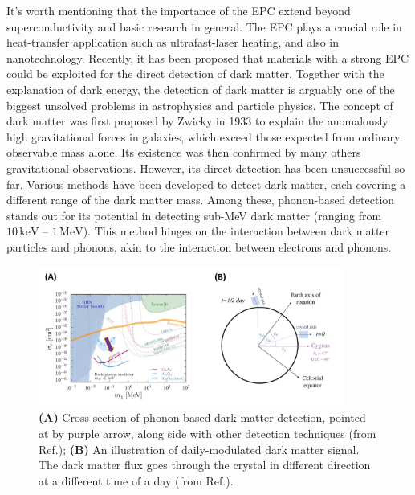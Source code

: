 \documentclass[11pt]{article}
\begin{document}
It's worth mentioning that the importance of the EPC extend beyond superconductivity and basic research in general.
The EPC plays a crucial role in heat-transfer application such as ultrafast-laser heating\cite{guo_heat_2012}, and also in nanotechnology\cite{zheng_dynamics_2018}.
Recently, it has been proposed that materials with a strong EPC could be exploited for the direct detection of dark matter.
Together with the explanation of dark energy, the detection of dark matter is arguably one of the biggest unsolved problems in astrophysics and particle physics.
The concept of dark matter was first proposed by Zwicky in 1933\cite{andernach_english_2017} to explain the anomalously high gravitational forces in galaxies, which exceed those expected from ordinary observable mass alone. Its existence was then confirmed by many others gravitational observations.
However, its direct detection has been unsuccessful so far.
Various methods have been developed to detect dark matter\cite{bergstrom_non-baryonic_2000}, each covering a different range of the dark matter mass\cite{vogel_dark_2014,essig_first_2012,davidson_updated_2000}. Among these, phonon-based detection stands out for its potential in detecting sub-MeV dark matter (ranging from $ 10\,\mathrm{keV}$ -- $1\,\mathrm{MeV}$). This method hinges on the interaction between dark matter particles and phonons, akin to the interaction between electrons and phonons\cite{griffin_directional_2018}. 
%
\begin{figure}[t]
    \centering
    \includegraphics[width=0.9\textwidth]{figures/third_figure.jpg}
    \caption{\textbf{(A)} Cross section of phonon-based dark matter detection, pointed at by purple arrow, along side with other detection techniques (from Ref.\cite{griffin_directional_2018}); \textbf{(B)} An illustration of daily-modulated dark matter signal. The dark matter flux goes through the crystal in different direction at a different time of a day (from Ref.\cite{griffin_directional_2018}).}
    \label{third_figure}
\end{figure}
\end{document}
